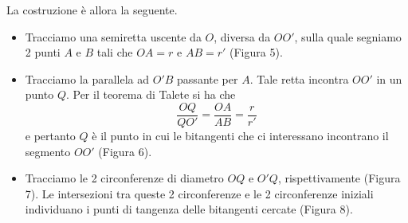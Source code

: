 {\begin{center}
	
	\endpspicture
	\hfill\mbox{}
\end{center}

La costruzione è allora la seguente.
\begin{itemize}
	\item  Tracciamo una semiretta uscente da $O$, diversa da $OO'$, sulla quale segniamo 2 punti $A$ e $B$ tali che $OA=r$ e $AB=r'$ (Figura 5).

	\item  Tracciamo la parallela ad $O'B$ passante per $A$. Tale retta incontra $OO'$ in un punto $Q$. Per il teorema di Talete si ha che
	$$\frac{OQ}{QO'}=\frac{OA}{AB}=\frac{r}{r'}$$
	e pertanto $Q$ è il punto in cui le bitangenti che ci interessano incontrano il segmento $OO'$ (Figura 6).

	\item Tracciamo le 2 circonferenze di diametro $OQ$ e $O'Q$, rispettivamente (Figura 7).  Le intersezioni tra queste 2 circonferenze e le 2 circonferenze iniziali individuano i punti di tangenza delle bitangenti cercate (Figura 8).
\end{itemize}

}

\renewcommand{\SoluzioniAlternative}{
}

\renewcommand{\Osservazioni}{
}

\renewcommand{\Commenti}{
}
